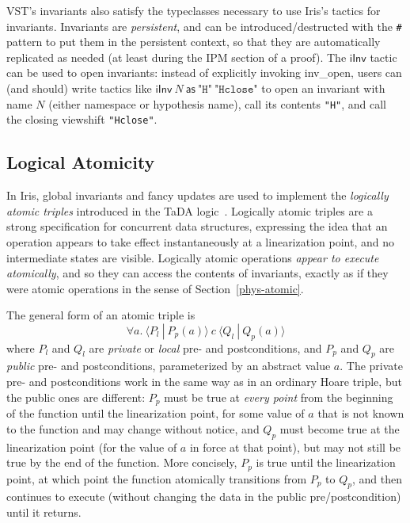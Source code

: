 \documentclass[11pt]{article}
\begin{document}
VST's invariants also satisfy the typeclasses necessary to use Iris's tactics for invariants. Invariants are \emph{persistent}, and can be introduced/destructed with the \texttt{\#} pattern to put them in the persistent context, so that they are automatically replicated as needed (at least during the IPM section of a proof). The $\mathsf{iInv}$ tactic can be used to open invariants: instead of explicitly invoking \textsf{inv\_open}, users can (and should) write tactics like $\mathsf{iInv}\ N\ \mathsf{as}\ \texttt{"H"}\ \texttt{"Hclose"}$ to open an invariant with name $N$ (either namespace or hypothesis name), call its contents \texttt{"H"}, and call the closing viewshift \texttt{"Hclose"}.

\subsection{Logical Atomicity}
In Iris, global invariants and fancy updates are used to implement the \emph{logically atomic triples} introduced in the TaDA logic~\cite{tada}. Logically atomic triples are a strong specification for concurrent data structures, expressing the idea that an operation appears to take effect instantaneously at a linearization point, and no intermediate states are visible. Logically atomic operations \emph{appear to execute atomically}, and so they can access the contents of invariants, exactly as if they were atomic operations in the sense of Section~\ref{phys-atomic}.

The general form of an atomic triple is $$\forall a.\ \langle P_l\ |\ P_p(a)\rangle\ c\ \langle Q_l\ |\ Q_p(a)\rangle$$
where $P_l$ and $Q_l$ are \emph{private} or \emph{local} pre- and postconditions, and $P_p$ and $Q_p$ are \emph{public} pre- and postconditions, parameterized by an abstract value $a$. The private pre- and postconditions work in the same way as in an ordinary Hoare triple, but the public ones are different: $P_p$ must be true at \emph{every point} from the beginning of the function until the linearization point, for some value of $a$ that is not known to the function and may change without notice, and $Q_p$ must become true at the linearization point (for the value of $a$ in force at that point), but may not still be true by the end of the function. More concisely, $P_p$ is true until the linearization point, at which point the function atomically transitions from $P_p$ to $Q_p$, and then continues to execute (without changing the data in the public pre/postcondition) until it returns.
\end{document}
